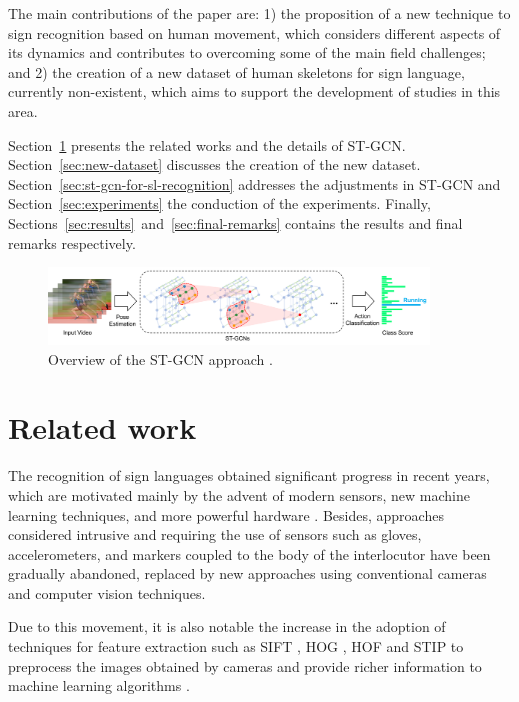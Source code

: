 The main contributions of the paper are: 1) the proposition of a new technique to sign recognition based on human movement, which considers different aspects of its dynamics and contributes to overcoming some of the main field challenges; and 2) the creation of a new dataset of human skeletons for sign language, currently non-existent, which aims to support the development of studies in this area.

Section~\ref{sec:related-work} presents the related works and the details of ST-GCN. Section~\ref{sec:new-dataset} discusses the creation of the new dataset. Section~\ref{sec:st-gcn-for-sl-recognition} addresses the adjustments in ST-GCN and Section~\ref{sec:experiments} the conduction of the experiments. Finally, Sections~\ref{sec:results}~and~\ref{sec:final-remarks} contains the results and final remarks respectively.

\begin{figure}[!ht]
    \centering
    \includegraphics[width=0.9\textwidth]{images/st_gcn_workflow}
    \caption{Overview of the ST-GCN approach \cite[p. 3]{st-gcn-2018}.}
    \label{fig:st-gcn-workflow}
\end{figure}


\section{Related work}
\label{sec:related-work}

The recognition of sign languages obtained significant progress in recent years, which are motivated mainly by the advent of modern sensors, new machine learning techniques, and more powerful hardware \cite{recent-advances-dl-2017, recent-advances-sl-2013}. Besides, approaches considered intrusive and requiring the use of sensors such as gloves, accelerometers, and markers coupled to the body of the interlocutor have been gradually abandoned, replaced by new approaches using conventional cameras and computer vision techniques.

Due to this movement, it is also notable the increase in the adoption of techniques for feature extraction such as SIFT \cite{lowe-2004}, HOG \cite{dalal-2005}, HOF \cite{laptev-2008} and STIP \cite{laptev-2008} to preprocess the images obtained by cameras and provide richer information to machine learning algorithms \cite{lim-2016, shanta-2018}.

